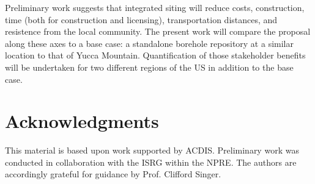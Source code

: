 \documentclass{anstrans}
\begin{document}
Preliminary work \cite{waleed_regional_2015} suggests that integrated siting 
will reduce costs, construction, time (both for construction and licensing), 
transportation distances, and resistence from the local community.  The present 
work will compare the proposal along these axes to a base case: a standalone 
borehole repository at a similar location to that of Yucca Mountain.  
Quantification of those stakeholder benefits will be undertaken for two 
different regions of the US in addition to the base case.  

\section{Acknowledgments}

This material is based upon work supported by \gls{ACDIS}. Preliminary work was 
conducted in collaboration with the \gls{ISRG} within the \gls{NPRE}. The 
authors are accordingly grateful for guidance by Prof. Clifford Singer.



\end{document}

